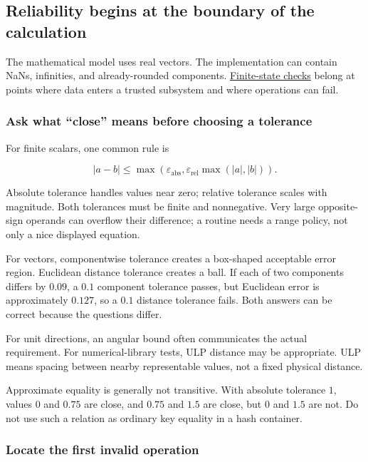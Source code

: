 \subsection{Reliability begins at the boundary of the calculation}\label{reliability-begins-at-the-boundary-of-the-calculation}

The mathematical model uses real vectors. The implementation can contain NaNs, infinities, and already-rounded components. \hyperref[02-foundations-ii-ch037]{Finite-state checks} belong at points where data enters a trusted subsystem and where operations can fail.

\subsubsection{Ask what ``close'' means before choosing a tolerance}\label{ask-what-close-means-before-choosing-a-tolerance}

For finite scalars, one common rule is

\[
|a-b|\le\max\left(\varepsilon_{\mathrm{abs}},
\varepsilon_{\mathrm{rel}}\max(|a|,|b|)\right).
\]

Absolute tolerance handles values near zero; relative tolerance scales with magnitude. Both tolerances must be finite and nonnegative. Very large opposite-sign operands can overflow their difference; a routine needs a range policy, not only a nice displayed equation.

For vectors, componentwise tolerance creates a box-shaped acceptable error region. Euclidean distance tolerance creates a ball. If each of two components differs by \(0.09\), a \(0.1\) component tolerance passes, but Euclidean error is approximately \(0.127\), so a \(0.1\) distance tolerance fails. Both answers can be correct because the questions differ.

For unit directions, an angular bound often communicates the actual requirement. For numerical-library tests, ULP distance may be appropriate. ULP means spacing between nearby representable values, not a fixed physical distance.

Approximate equality is generally not transitive. With absolute tolerance \(1\), values \(0\) and \(0.75\) are close, and \(0.75\) and \(1.5\) are close, but \(0\) and \(1.5\) are not. Do not use such a relation as ordinary key equality in a hash container.

\subsubsection{Locate the first invalid operation}\label{locate-the-first-invalid-operation}

